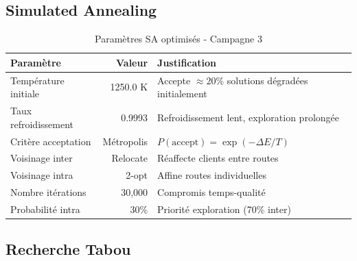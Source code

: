 \documentclass[12pt,a4paper,twoside]{report}
\begin{document}
\subsection{Simulated Annealing}

\begin{table}[H]
    \centering
    \caption{Paramètres SA optimisés - Campagne 3}
    \begin{tabular}{|l|r|l|}
        \hline
        \textbf{Paramètre}   & \textbf{Valeur} & \textbf{Justification}                                  \\
        \hline
        Température initiale & 1250.0 K        & Accepte $\approx 20\%$ solutions dégradées initialement \\
        Taux refroidissement & 0.9993          & Refroidissement lent, exploration prolongée             \\
        Critère acceptation  & Métropolis      & $P(\text{accept}) = \exp(-\Delta E / T)$                \\
        Voisinage inter      & Relocate        & Réaffecte clients entre routes                          \\
        Voisinage intra      & 2-opt           & Affine routes individuelles                             \\
        Nombre itérations    & 30,000          & Compromis temps-qualité                                 \\
        Probabilité intra    & 30\%            & Priorité exploration (70\% inter)                       \\
        \hline
    \end{tabular}
\end{table}

\subsection{Recherche Tabou}
\end{document}
